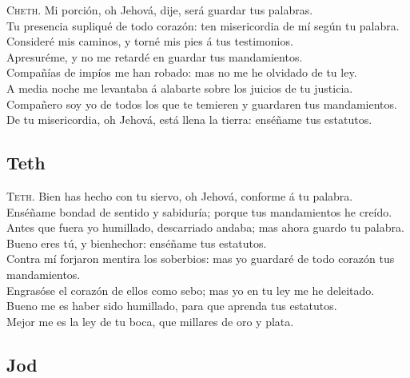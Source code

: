  \textsc{Cheth}. Mi porción, oh Jehová, dije, será
guardar tus palabras.\\
 Tu presencia supliqué de todo corazón: ten misericordia
de mí según tu palabra.\\
 Consideré mis caminos, y torné mis pies á tus
testimonios.\\
 Apresuréme, y no me retardé en guardar tus
mandamientos.\\
 Compañías de impíos me han robado: mas no me he olvidado
de tu ley.\\
 A media noche me levantaba á alabarte sobre los juicios
de tu justicia.\\
 Compañero soy yo de todos los que te temieren y
guardaren tus mandamientos.\\
 De tu misericordia, oh Jehová, está llena la tierra:
enséñame tus estatutos.

\hypertarget{teth}{%
\subsection{Teth}\label{teth}}

 \textsc{Teth}. Bien has hecho con tu siervo, oh Jehová,
conforme á tu palabra.\\
 Enséñame bondad de sentido y sabiduría; porque tus
mandamientos he creído.\\
 Antes que fuera yo humillado, descarriado andaba; mas
ahora guardo tu palabra.\\
 Bueno eres tú, y bienhechor: enséñame tus estatutos.\\
 Contra mí forjaron mentira los soberbios: mas yo
guardaré de todo corazón tus mandamientos.\\
 Engrasóse el corazón de ellos como sebo; mas yo en tu
ley me he deleitado.\\
 Bueno me es haber sido humillado, para que aprenda tus
estatutos.\\
 Mejor me es la ley de tu boca, que millares de oro y
plata.

\hypertarget{jod}{%
\subsection{Jod}\label{jod}}

